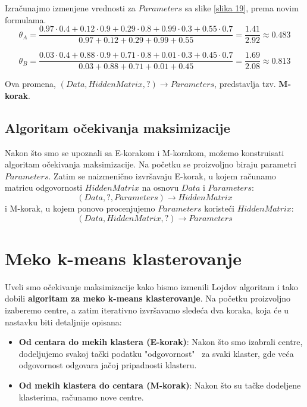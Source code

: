 \documentclass[a4paper]{book}
\begin{document}
Izračunajmo izmenjene vrednosti za $Parameters$ sa slike \ref{slika 19}, prema novim formulama. 
$$\theta_A = \frac{0.97 \cdot 0.4 + 0.12 \cdot 0.9 + 0.29 \cdot 0.8 + 0.99 \cdot 0.3 + 0.55 \cdot 0.7}{0.97 + 0.12 + 0.29 + 0.99 + 0.55} = \frac{1.41}{2.92} \approx 0.483$$

$$\theta_B = \frac{0.03 \cdot 0.4 + 0.88 \cdot 0.9 + 0.71 \cdot 0.8 + 0.01 \cdot 0.3 + 0.45 \cdot 0.7}{0.03 + 0.88 + 0.71 + 0.01 + 0.45} = \frac{1.69}{2.08} \approx 0.813$$

Ova promena, $(Data, HiddenMatrix, ?) \rightarrow Parameters$, 	predstavlja tzv. \textbf{M-korak}.

\subsection{Algoritam očekivanja maksimizacije}

Nakon što smo se upoznali sa E-korakom i M-korakom, možemo konstruisati algoritam očekivanja maksimizacije.
Na početku se proizvoljno biraju parametri $Parameters$. Zatim se naizmenično izvršavaju E-korak, u kojem računamo matricu odgovornosti $HiddenMatrix$ na osnovu $Data$ i $Parameters$:
$$(Data, ?, Parameters) \rightarrow HiddenMatrix$$
i M-korak, u kojem ponovo procenjujemo $Parameters$ koristeći $HiddenMatrix$:
$$(Data, HiddenMatrix, ?) \rightarrow Parameters$$
 	
\section{Meko k-means klasterovanje}

Uveli smo očekivanje maksimizacije kako bismo izmenili Lojdov algoritam i tako dobili \textbf{algoritam za meko k-means klasterovanje}. Na početku proizvoljno izaberemo centre, a zatim iterativno izvršavamo sledeća dva koraka, koja će u nastavku biti detaljnije opisana:

\begin{itemize}
    \item \textbf{Od centara do mekih klastera (E-korak)}: Nakon što smo izabrali centre, dodeljujemo svakoj tački podatku "odgovornost" \ za svaki klaster, gde veća odgovornost odgovara jačoj pripadnosti klasteru.
    \item \textbf{Od mekih klastera do centara (M-korak)}: Nakon što su tačke dodeljene klasterima, računamo nove centre.
\end{itemize}
\end{document}
